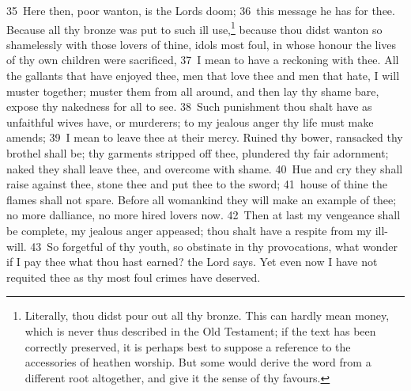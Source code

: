 \documentclass[10pt]{book} %
\begin{document}
\textcolor{benred8}{35}~Here then, poor wanton, is the Lord\textquotesingle s doom; \textcolor{benred8}{36}~this message he has for thee. Because all thy bronze was put to such ill use,\footnote[3]{Literally, \textasciigrave thou didst pour out all thy bronze\textquotesingle . This can hardly mean money, which is never thus described in the Old Testament; if the text has been correctly preserved, it is perhaps best to suppose a reference to the accessories of heathen worship. But some would derive the word from a different root altogether, and give it the sense of \textasciigrave thy favours\textquotesingle .} because thou didst wanton so shamelessly with those lovers of thine, idols most foul, in whose honour the lives of thy own children were sacrificed, \textcolor{benred8}{37}~I mean to have a reckoning with thee. All the gallants that have enjoyed thee, men that love thee and men that hate, I will muster together; muster them from all around, and then lay thy shame bare, expose thy nakedness for all to see. \textcolor{benred8}{38}~Such punishment thou shalt have as unfaithful wives have, or murderers; to my jealous anger thy life must make amends; \textcolor{benred8}{39}~I mean to leave thee at their mercy. Ruined thy bower, ransacked thy brothel shall be; thy garments stripped off thee, plundered thy fair adornment; naked they shall leave thee, and overcome with shame. \textcolor{benred8}{40}~Hue and cry they shall raise against thee, stone thee and put thee to the sword; \textcolor{benred8}{41}~house of thine the flames shall not spare. Before all womankind they will make an example of thee; no more dalliance, no more hired lovers now. \textcolor{benred8}{42}~Then at last my vengeance shall be complete, my jealous anger appeased; thou shalt have a respite from my ill-will. \textcolor{benred8}{43}~So forgetful of thy youth, so obstinate in thy provocations, what wonder if I pay thee what thou hast earned? the Lord says. Yet even now I have not requited thee as thy most foul crimes have deserved.
\end{document}
